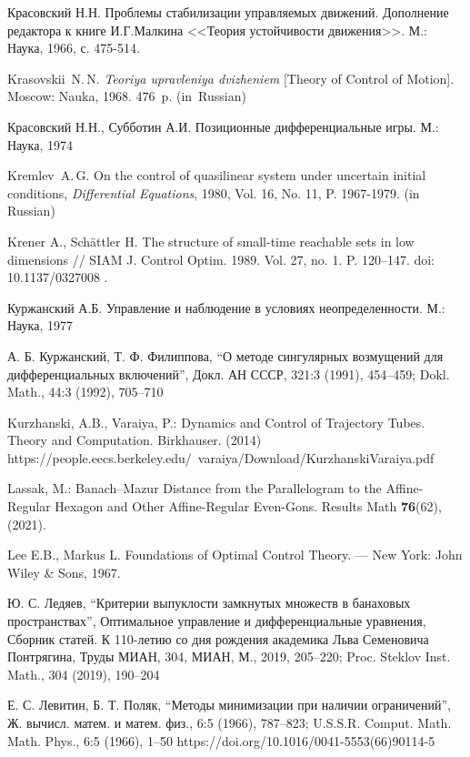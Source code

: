 \documentclass[../main.tex]{subfiles}
\begin{document}
\begin{thebibliography}{99}
Красовский Н.Н. Проблемы стабилизации управляемых движений. Дополнение редактора к книге И.Г.Малкина <<Теория устойчивости  движения>>. М.: Наука, 1966, с. 475-514.

{Krasovskii~N.\,N.} \emph{Teoriya upravleniya dvizheniem} [Theory of Control of Motion]. Moscow: Nauka, 1968. 476~p. (in~Russian)

Красовский Н.Н., Субботин А.И. Позиционные дифференциальные игры. М.: Наука, 1974

Kremlev~A.\,G. On the control of quasilinear system under uncertain initial conditions, \emph{Differential Equations}, 1980, Vol. 16, No. 11, P. 1967-1979. (in Russian)

Krener A., Sch\"{a}ttler H. The structure of small-time reachable sets in low dimensions // SIAM J. Control Optim. 1989. Vol. 27, no. 1. P. 120–147. doi: 10.1137/0327008 .

Куржанский А.Б. Управление и наблюдение в условиях неопределенности. М.: Наука, 1977

А. Б. Куржанский, Т. Ф. Филиппова, “О методе сингулярных возмущений для дифференциальных включений”, Докл. АН СССР, 321:3 (1991), 454–459; Dokl. Math., 44:3 (1992), 705–710

Kurzhanski, A.B., Varaiya, P.: Dynamics and Control of Trajectory Tubes. Theory and Computation. Birkhauser. (2014)\\ https://people.eecs.berkeley.edu/~varaiya/Download/KurzhanskiVaraiya.pdf

Lassak, M.: Banach–Mazur Distance from the Parallelogram to the Affine-Regular Hexagon and Other Affine-Regular Even-Gons. Results Math \textbf{76}(62), (2021). 

Lee E.B., Markus L. Foundations of Optimal Control Theory. — New York: John Wiley \& Sons, 1967.

Ю. С. Ледяев, “Критерии выпуклости замкнутых множеств в банаховых пространствах”, Оптимальное управление и дифференциальные уравнения, Сборник статей. К 110-летию со дня рождения академика Льва Семеновича Понтрягина, Труды МИАН, 304, МИАН, М., 2019, 205–220; Proc. Steklov Inst. Math., 304 (2019), 190–204

Е. С. Левитин, Б. Т. Поляк, “Методы минимизации при наличии ограничений”, Ж. вычисл. матем. и матем. физ., 6:5 (1966), 787–823; U.S.S.R. Comput. Math. Math. Phys., 6:5 (1966), 1–50 https://doi.org/10.1016/0041-5553(66)90114-5


\end{thebibliography}
\end{document}
